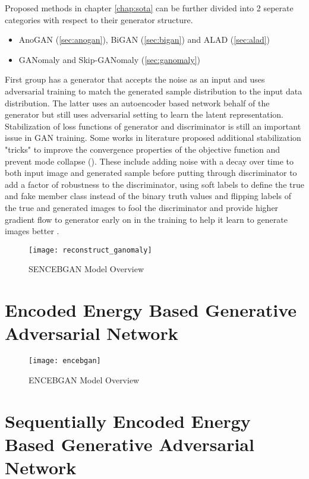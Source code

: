 Proposed methods in chapter \ref{chap:sota} can be further divided into 2 seperate categories with respect to their generator structure. 
\begin{itemize}
	\item AnoGAN (\ref{sec:anogan}), BiGAN (\ref{sec:bigan}) and ALAD (\ref{sec:alad})
	\item GANomaly and Skip-GANomaly (\ref{sec:ganomaly})
\end{itemize}

First group has a generator that accepts the noise as an input and uses adversarial training to match the generated sample distribution 
to the input data distribution. The latter uses an autoencoder based network behalf of the generator but still uses adversarial setting 
to learn the latent representation. Stabilization of loss functions of generator and discriminator is still an important issue in GAN training. 
Some works in literature proposed additional stabilization "tricks" to improve the convergence properties of the objective function 
and prevent mode collapse (\cite{methods,fm}). These include adding noise with a decay over time to both input image and generated 
sample before putting through discriminator to add a factor of robustness to the discriminator, using soft labels to define the true 
and fake member class instead of the binary truth values and flipping labels of the true and generated images to fool the discriminator 
and provide higher gradient flow to generator early on in the training to help it learn to generate images better \cite{fm}.

\begin{figure}[h!]
	\centering
	\texttt{[image: reconstruct\_ganomaly]}
	\caption{SENCEBGAN Model Overview }
	\label{fig:sencebgan_model}
\end{figure}

\section{Encoded Energy Based Generative Adversarial Network}
\label{sec:encebgan}

\begin{figure}[h!]
	\centering
	\texttt{[image: encebgan]}
	\caption{ENCEBGAN Model Overview }
	\label{fig:encebgan_model}
\end{figure}

\section{Sequentially Encoded Energy Based Generative Adversarial Network}
\label{sec:sencebgan}

